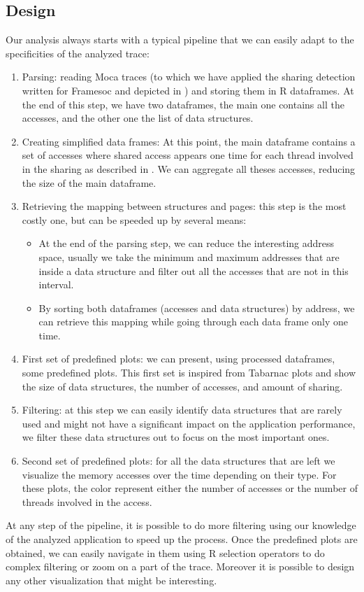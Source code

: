 \subsection{Design}

Our analysis always starts with a typical pipeline that we can easily adapt to the specificities of the analyzed trace:
\begin{enumerate}
    \item Parsing: reading \gls{Moca} traces (to which we have applied the sharing detection written for \gls{Framesoc} and depicted in )
        and storing them in \gls{R} dataframes.
        At the end of this step, we have two dataframes, the main one contains all the accesses, and the other one the list of data structures.
    \item Creating simplified data frames: At this point, the main dataframe contains a set of accesses where shared access appears one time for each thread involved in the sharing as described in .
        We can aggregate all theses accesses, reducing the size of the main dataframe.
    \item Retrieving the mapping between structures and pages: this step is the most costly one, but can be speeded up by several means:
        \begin{itemize}
            \item At the end of the parsing step, we can reduce the interesting address space, usually we take the minimum and maximum addresses that are inside a data structure and filter out all the accesses that are not in this interval.
            \item By sorting both dataframes (accesses and data structures) by address, we can retrieve this mapping while going through each data frame only one time.
        \end{itemize}
    \item First set of predefined plots: we can present, using processed dataframes, some predefined  plots. This first set is inspired from \gls{Tabarnac} plots and show the size of data structures, the number of accesses, and amount of sharing.
    \item  Filtering: at this step we can easily identify data structures that are rarely used and might not have a significant impact on the application performance, we filter these data structures out to focus on the most important ones.
    \item Second set of predefined plots: for all the data structures that are left we visualize the memory accesses over the time depending on their type.
        For these plots, the color represent either the number of accesses or the number of threads involved in the access.
\end{enumerate}
At any step of the pipeline, it is possible to do more filtering using our knowledge of the analyzed application to speed up the process.
Once the predefined plots are obtained, we can easily navigate in them using \gls{R} selection operators to do complex filtering or zoom on a part of the trace.
Moreover it is possible to design any other visualization that might be interesting.

